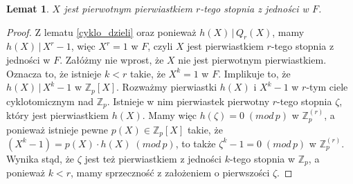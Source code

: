 \documentclass[polish,declaration,shortabstract]{iithesis}
\theoremstyle{definition}
\theoremstyle{remark} \newtheorem{observation}{Obserwacja}
\theoremstyle{plain} \newtheorem{theorem}{Twierdzenie}
\theoremstyle{plain} \newtheorem{lemma}{Lemat}
\theoremstyle{remark} \newtheorem*{remark*}{Uwaga}
\theoremstyle{reminder} \newtheorem*{reminder*}{Przypomnienie}
\begin{document}
\begin{lemma}\label{X_pierw}
	$X$ jest pierwotnym pierwiastkiem $r$-tego stopnia z jedności w $F$.
\end{lemma}
	
\begin{proof}
	Z lematu \ref{cyklo_dzieli} oraz ponieważ $h(X) \, | \, Q_r(X)$, mamy $h(X) \, | \, X^r - 1$, więc $X^r = 1$ w $F$, czyli $X$ jest pierwiastkiem $r$-tego stopnia z jedności w $F$. 
	Załóżmy nie wprost, że $X$ nie jest pierwotnym pierwiastkiem. Oznacza to, że istnieje $k < r$ takie, że $X^k = 1$ w $F$. Implikuje to, że $h(X) \, | \, X^k - 1$ w $\mathbb{Z}_p[X]$. 
	Rozważmy pierwiastki $h(X)$ i $X^k - 1$ w $r$-tym ciele cyklotomicznym nad $\mathbb{Z}_p$. Istnieje w nim pierwiastek pierwotny $r$-tego stopnia $\zeta$, który jest pierwiastkiem $h(X)$. 
	Mamy więc $h(\zeta) = 0 \; (mod \, p)$ w $\mathbb{Z}_p^{(r)}$, a ponieważ istnieje pewne $p(X) \in \mathbb{Z}_p[X]$ takie, że $(X^k - 1) = p(X) \cdot h(X) \; (mod \, p)$, to także $\zeta^k - 1 = 0 \; (mod \, p)$ w $\mathbb{Z}_p^{(r)}$. Wynika stąd, że $\zeta$ jest też pierwiastkiem z jedności $k$-tego stopnia w $\mathbb{Z}_p$, a ponieważ $k < r$, mamy sprzeczność z założeniem o pierwszości $\zeta$.
\end{proof}

	
\end{document}
